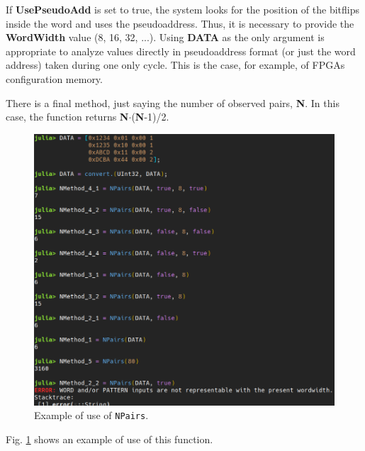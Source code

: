 \begin{itemize}
	If \textbf{UsePseudoAdd} is set to true, the system looks for the position of the bitflips inside the word and uses the pseudoaddress. Thus, it is necessary to provide the \textbf{WordWidth} value (8, 16, 32, ...). Using \textbf{DATA} as the only argument is appropriate to analyze values directly in pseudoaddress format (or just the word address) taken during one only cycle. This is the case, for example, of FPGAs configuration memory. 
	
	There is a final method, just saying the number of observed pairs, \textbf{N}. In this case, the function returns \textbf{N}\(\cdot\)(\textbf{N}-1)/2.

	\begin{figure}[h!]
		\centering
		\includegraphics[width=0.75\columnwidth]{fig/functions/NPairs.png}
		\caption{Example of use of \texttt{NPairs}.}
		\label{fig:Example_NPAirs}
	\end{figure}

	Fig. \ref{fig:Example_NPAirs} shows an example of use of this function. 
	
\end{itemize}
%
